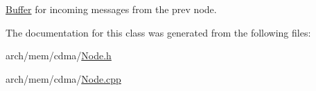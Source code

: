 \hyperlink{class_simulator_1_1_buffer}{Buffer} for incoming messages from the prev node. 



The documentation for this class was generated from the following files\+:\begin{DoxyCompactItemize}
\item 
arch/mem/cdma/\hyperlink{cdma_2_node_8h}{Node.\+h}\item 
arch/mem/cdma/\hyperlink{cdma_2_node_8cpp}{Node.\+cpp}\end{DoxyCompactItemize}
